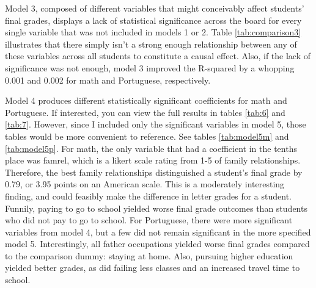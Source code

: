 \documentclass[12pt,english]{article}
\begin{document}
Model 3, composed of different variables that might conceivably affect students' final grades, displays a lack of statistical significance across the board for every single variable that was not included in models 1 or 2. Table \ref{tab:comparison3} illustrates that there simply isn't a strong enough relationship between any of these variables across all students to constitute a causal effect. Also, if the lack of significance was not enough, model 3 improved the R-squared by a whopping 0.001 and 0.002 for math and Portuguese, respectively. 

Model 4 produces different statistically significant coefficients for math and Portuguese. If interested, you can view the full results in tables \ref{tab:6} and \ref{tab:7}. However, since I included only the significant variables in model 5, those tables would be more convenient to reference. See tables \ref{tab:model5m} and \ref{tab:model5p}. For math, the only variable that had a coefficient in the tenths place was famrel, which is a likert scale rating from 1-5 of family relationships. Therefore, the best family relationships distinguished a student's final grade by 0.79, or 3.95 points on an American scale. This is a moderately interesting finding, and could feasibly make the difference in letter grades for a student. Funnily, paying to go to school yielded worse final grade outcomes than students who did not pay to go to school. For Portuguese, there were more significant variables from model 4, but a few did not remain significant in the more specified model 5. Interestingly, all father occupations yielded worse final grades compared to the comparison dummy: staying at home. Also, pursuing higher education yielded better grades, as did failing less classes and an increased travel time to school.
\end{document}
